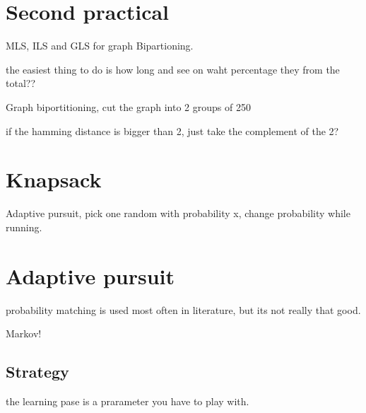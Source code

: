 \documentclass{article}
\begin{document}
\section{Second practical}

MLS, ILS and GLS for graph Bipartioning.

the easiest thing to do is how long and see on waht
percentage they from the total??


Graph biportitioning, cut the graph into 2 groups
of 250

if the hamming distance is bigger than 2, just take
the complement of the 2?

\section{Knapsack}
Adaptive pursuit, pick one random with probability x, change
probability while running.

\section{Adaptive pursuit}
probability matching is used most often in literature, but its not
really that good.

Markov!

\subsection{Strategy}
the learning pase is a prarameter you have to play with.
\end{document}
